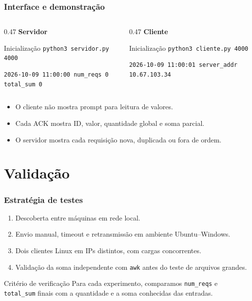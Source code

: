 \documentclass{beamer}
\begin{document}
\begin{frame}
  \frametitle{Interface e demonstração}
  \begin{columns}[T]
    \begin{column}{0.47\textwidth}
      \textbf{Servidor}
      \begin{exampleblock}{Inicialização}
        \texttt{python3 servidor.py 4000}
      \end{exampleblock}
      \small
      \texttt{2026-10-09 11:00:00 num\_reqs 0 total\_sum 0}
    \end{column}
    \begin{column}{0.47\textwidth}
      \textbf{Cliente}
      \begin{exampleblock}{Inicialização}
        \texttt{python3 cliente.py 4000}
      \end{exampleblock}
      \small
      \texttt{2026-10-09 11:00:01 server\_addr 10.67.103.34}
    \end{column}
  \end{columns}

  \vspace{1em}
  \begin{itemize}
    \item O cliente não mostra prompt para leitura de valores.
    \item Cada ACK mostra ID, valor, quantidade global e soma parcial.
    \item O servidor mostra cada requisição nova, duplicada ou fora de ordem.
  \end{itemize}
\end{frame}

\section{Validação}

\begin{frame}
  \frametitle{Estratégia de testes}
  \begin{enumerate}
    \item Descoberta entre máquinas em rede local.
    \item Envio manual, timeout e retransmissão em ambiente Ubuntu--Windows.
    \item Dois clientes Linux em IPs distintos, com cargas concorrentes.
    \item Validação da soma independente com \texttt{awk} antes do teste de arquivos grandes.
  \end{enumerate}

  \vspace{1em}
  \begin{block}{Critério de verificação}
    Para cada experimento, comparamos \texttt{num\_reqs} e \texttt{total\_sum} finais com a quantidade e a soma conhecidas das entradas.
  \end{block}
\end{frame}
\end{document}
